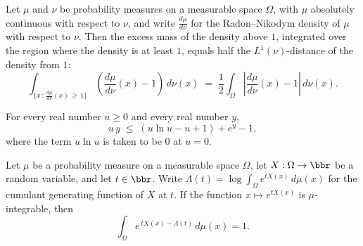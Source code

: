 \begin{theorem}
\label{CommunicationComplexity.densityPositiveIntegral_eq_half_densityAbsIntegral_of_ac}
\leanok
{}
Let $\mu$ and $\nu$ be probability measures on a measurable space $\Omega$, with $\mu$
absolutely continuous with respect to $\nu$, and write $\frac{d\mu}{d\nu}$ for the
Radon–Nikodym density of $\mu$ with respect to $\nu$. Then the excess mass of the
density above $1$, integrated over the region where the density is at least $1$, equals
half the $L^1(\nu)$-distance of the density from $1$:
\[
\int_{\{x\,:\,\frac{d\mu}{d\nu}(x)\,\ge\,1\}}
\left(\frac{d\mu}{d\nu}(x)-1\right)\,d\nu(x) \;=\; \frac{1}{2}\int_{\Omega}
\left|\frac{d\mu}{d\nu}(x)-1\right|\,d\nu(x).
\]
\end{theorem}

\begin{theorem}
\label{CommunicationComplexity.mul_le_klFun_add_exp_sub_one}
\leanok
{}
For every real number $u \ge 0$ and every real number $y$,
\[
u\,y \;\le\; \left(u\ln u - u + 1\right) + e^{y} - 1,
\]
where the term $u\ln u$ is taken to be $0$ at $u = 0$.
\end{theorem}

\begin{theorem}
\label{CommunicationComplexity.integral_exp_sub_cgf_eq_one}
\leanok
{}
Let $\mu$ be a probability measure on a measurable space $\Omega$, let $X : \Omega \to
\bbr$ be a random variable, and let $t \in \bbr$. Write $\Lambda(t) = \log \int_\Omega
e^{t X(x)}\,d\mu(x)$ for the cumulant generating function of $X$ at $t$. If the function
$x \mapsto e^{t X(x)}$ is $\mu$-integrable, then
\[
\int_\Omega e^{\,t X(x) - \Lambda(t)}\,d\mu(x) = 1.
\]
\end{theorem}

